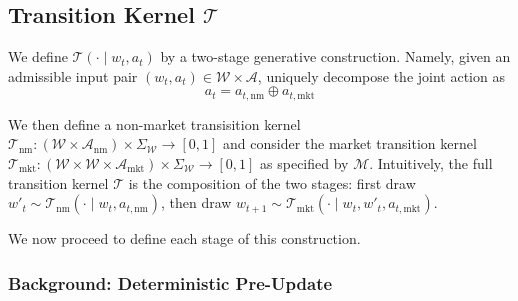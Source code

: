 \documentclass[letterpaper]{article} %
\begin{document}
\subsection{Transition Kernel $\mathcal{T}$}

We define $\mathcal{T}(\cdot\mid w_t,a_t)$ by a two-stage generative construction. Namely, given an admissible input pair $(w_t,a_t) \in \mathcal{W} \times \mathcal{A}$, uniquely decompose the joint action as
\[
a_t = a_{t,\mathrm{nm}} \oplus a_{t,\mathrm{mkt}}
\]

We then define a non-market transisition kernel $\mathcal{T}_{\mathrm{nm}} : (\mathcal{W} \times \mathcal{A}_\mathrm{nm}) \times \Sigma_{\mathcal{W}} \to [0,1]$ and consider the market transition kernel $\mathcal{T}_{\mathrm{mkt}} : (\mathcal{W} \times \mathcal{W} \times \mathcal{A}_\mathrm{mkt}) \times \Sigma_{\mathcal{W}} \to [0,1]$ as specified by $\mathscr{M}$. Intuitively, the full transition kernel $\mathcal{T}$ is the composition of the two stages:
first draw $w'_t\sim \mathcal{T}_{\mathrm{nm}}(\cdot\mid w_t,a_{t,\mathrm{nm}})$, then draw
$w_{t+1}\sim \mathcal{T}_{\mathrm{mkt}}(\cdot\mid w_t,w'_t,a_{t,\mathrm{mkt}})$.

We now proceed to define each stage of this construction.

\subsubsection{Background: Deterministic Pre-Update}
 
\end{document}
